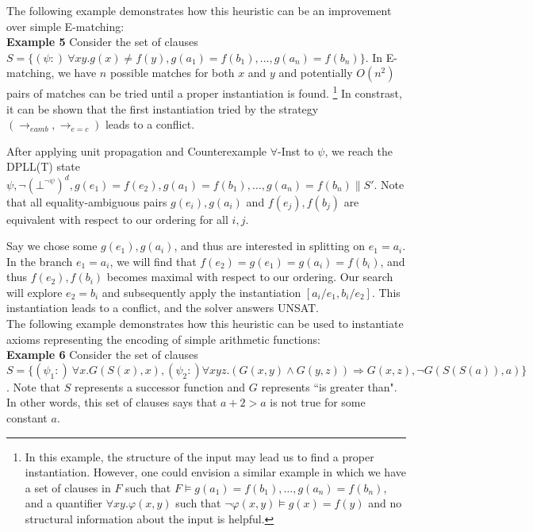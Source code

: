 \documentclass{llncs}
\begin{document}
The following example demonstrates how this heuristic can be an improvement over simple E-matching: \\

{\bf Example 5}
Consider the set of clauses $S = \{ (\psi :) \ \forall xy. g( x ) \neq f( y ), g( a_1 ) = f( b_1 ), \ldots, g( a_n ) = f( b_n ) \}$.
In E-matching, we have $n$ possible matches for both $x$ and $y$ and potentially $O(n^2)$ pairs of matches can be tried until a proper instantiation is found. 
\footnote{ In this example, the structure of the input may lead us to find a proper instantiation.
However, one could envision a similar example in which we have a set of clauses in $F$ such that $F \models g( a_1 ) = f( b_1 ), \ldots, g( a_n ) = f( b_n )$, and a quantifier $\forall xy. \varphi(x,y)$ such that $\neg \varphi( x, y ) \models g( x ) = f( y )$ and no structural information about the input is helpful. }
In constrast, it can be shown that the first instantiation tried by the strategy $( \rightarrow_{eamb}, \rightarrow_{e=c} )$ leads to a conflict.

After applying unit propagation and Counterexample $\forall$-Inst to $\psi$, we reach the DPLL(T) state $\psi, \neg (\bot^{\neg \psi})^d, g( e_1 ) = f( e_2 ), g( a_1 ) = f( b_1 ), \ldots, g( a_n ) = f( b_n ) \parallel S'$.
Note that all equality-ambiguous pairs $g( e_i ), g( a_i )$ and $f( e_j ), f( b_j )$ are equivalent with respect to our ordering for all $i,j$.

Say we chose some $g( e_1 ), g( a_i )$, and thus are interested in splitting on $e_1 = a_i$.
In the branch $e_1 = a_i$, we will find that $f( e_2 ) = g( e_1 ) = g( a_i ) = f( b_i )$, and thus $f( e_2 ), f( b_i )$ becomes maximal with respect to our ordering.
Our search will explore $e_2 = b_i$ and subsequently apply the instantiation $[ a_i/e_1, b_i/e_2]$. 
This instantiation leads to a conflict, and the solver answers UNSAT.  \\

The following example demonstrates how this heuristic can be used to instantiate axioms representing the encoding of simple arithmetic functions: \\

{\bf Example 6}
Consider the set of clauses $S = \{ (\psi_1 :) \ \forall x. G( S( x ), x), (\psi_2 :) \forall xyz. (G(x,y) \wedge G(y,z)) \Rightarrow G(x,z), \neg G( S(S(a)), a) \}$.
Note that $S$ represents a successor function and $G$ represents ``is greater than".  
In other words, this set of clauses says that $a + 2 > a$ is not true for some constant $a$.
\end{document}
